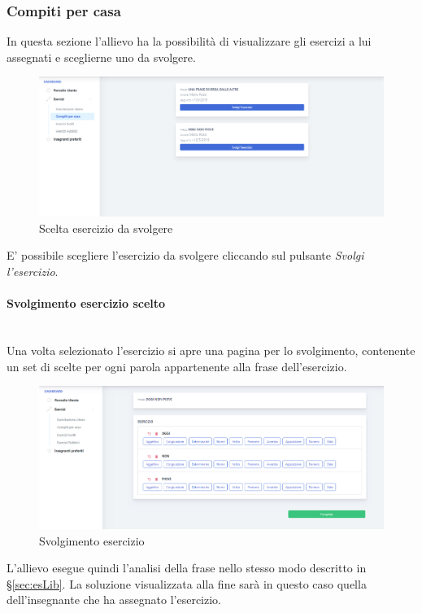         \newpage
  		\subsubsection{Compiti per casa}
 		  In questa sezione l'allievo ha la possibilità di visualizzare gli esercizi a lui assegnati e sceglierne uno da svolgere.
        	\begin{figure}[H]
            	\centering
            	\includegraphics[width=17cm]{sez/img/studente/compitopercasa.PNG} 
            	\caption{Scelta esercizio da svolgere}\label{fig:1}
        	\end{figure}

		  E' possibile scegliere l'esercizio da svolgere cliccando sul pulsante \textit{Svolgi l'esercizio}. 
		  
		  
		    \paragraph{Svolgimento esercizio scelto}\mbox{}\\
		    Una volta selezionato l'esercizio si apre una pagina per lo svolgimento, contenente un set di scelte per ogni parola appartenente alla frase dell'esercizio.     
       
        	\begin{figure}[H]
            	\centering
            	\includegraphics[width=17cm]{sez/img/studente/svolgimentoesercizio.PNG} 
            	\caption{Svolgimento esercizio}\label{fig:1}
        	\end{figure}      
	L'allievo esegue quindi l'analisi della frase nello stesso modo descritto in \S\ref{sec:esLib}. La soluzione visualizzata alla fine sarà in questo caso quella dell'insegnante che ha assegnato l'esercizio. 
	
